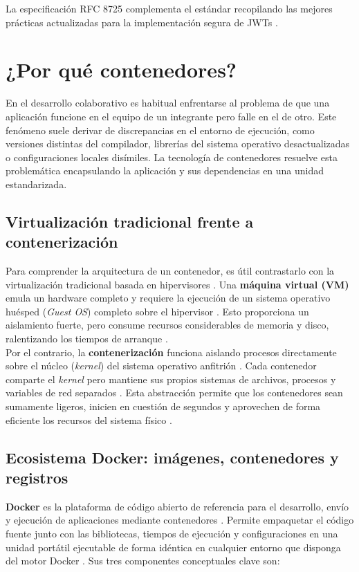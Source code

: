 	\begin{notabox}
		La especificaci\'on RFC 8725 complementa el est\'andar recopilando las mejores pr\'acticas actualizadas para la implementaci\'on segura de JWTs \cite{rfc8725}.
	\end{notabox}
	
	\section{¿Por qu\'e contenedores?}
	En el desarrollo colaborativo es habitual enfrentarse al problema de que una aplicaci\'on funcione en el equipo de un integrante pero falle en el de otro. Este fen\'omeno suele derivar de discrepancias en el entorno de ejecuci\'on, como versiones distintas del compilador, librer\'ias del sistema operativo desactualizadas o configuraciones locales dis\'imiles. La tecnolog\'ia de contenedores resuelve esta problem\'atica encapsulando la aplicaci\'on y sus dependencias en una unidad estandarizada.
	
	\subsection{Virtualizaci\'on tradicional frente a contenerizaci\'on}
	Para comprender la arquitectura de un contenedor, es \'util contrastarlo con la virtualizaci\'on tradicional basada en hipervisores \cite{docker_container}. Una \textbf{m\'aquina virtual (VM)} emula un hardware completo y requiere la ejecuci\'on de un sistema operativo hu\'esped (\textit{Guest OS}) completo sobre el hipervisor \cite{ibm_virtualization}. Esto proporciona un aislamiento fuerte, pero consume recursos considerables de memoria y disco, ralentizando los tiempos de arranque \cite{ibm_virtualization}. \\
	
	Por el contrario, la \textbf{contenerizaci\'on} funciona aislando procesos directamente sobre el n\'ucleo (\textit{kernel}) del sistema operativo anfitri\'on \cite{ibm_containerization, docker_container}. Cada contenedor comparte el \textit{kernel} pero mantiene sus propios sistemas de archivos, procesos y variables de red separados \cite{ibm_containerization, docker_container}. Esta abstracci\'on permite que los contenedores sean sumamente ligeros, inicien en cuesti\'on de segundos y aprovechen de forma eficiente los recursos del sistema f\'isico \cite{ibm_containerization,docker_container}.
	
	\subsection{Ecosistema Docker: im\'agenes, contenedores y registros}
	\textbf{Docker} es la plataforma de c\'odigo abierto de referencia para el desarrollo, env\'io y ejecuci\'on de aplicaciones mediante contenedores \cite{docker_overview}. Permite empaquetar el c\'odigo fuente junto con las bibliotecas, tiempos de ejecuci\'on y configuraciones en una unidad port\'atil ejecutable de forma id\'entica en cualquier entorno que disponga del motor Docker \cite{docker_overview}. Sus tres componentes conceptuales clave son:
	
